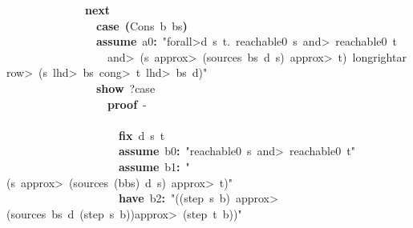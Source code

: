 \documentclass{article}
\newcommand{\syntaxKEYWORDA}[1]{\textcolor[rgb]{0.0,0.4,0.6}{\textbf{#1}}}
\newcommand{\syntaxKEYWORDC}[1]{\textcolor[rgb]{0.0,0.6,1.0}{\textbf{#1}}}
\newcommand{\syntaxLITERALA}[1]{\textcolor[rgb]{1.0,0.0,0.8}{#1}}
\newcommand{\syntaxOPERATOR}[1]{\textcolor[rgb]{0.0,0.0,0.0}{\textbf{#1}}}
\newcommand{\syntaxKEYWORDA}[1]{\textcolor[rgb]{0.0,0.4,0.6}{\textbf{#1}}}
\newcommand{\syntaxKEYWORDC}[1]{\textcolor[rgb]{0.0,0.6,1.0}{\textbf{#1}}}
\newcommand{\syntaxLITERALA}[1]{\textcolor[rgb]{1.0,0.0,0.8}{#1}}
\newcommand{\syntaxOPERATOR}[1]{\textcolor[rgb]{0.0,0.0,0.0}{\textbf{#1}}}
\newcommand{\syntaxKEYWORDA}[1]{\textcolor[rgb]{0.0,0.4,0.6}{\textbf{#1}}}
\newcommand{\syntaxKEYWORDC}[1]{\textcolor[rgb]{0.0,0.6,1.0}{\textbf{#1}}}
\newcommand{\syntaxLITERALA}[1]{\textcolor[rgb]{1.0,0.0,0.8}{#1}}
\newcommand{\syntaxOPERATOR}[1]{\textcolor[rgb]{0.0,0.0,0.0}{\textbf{#1}}}
\newcommand{\syntaxKEYWORDA}[1]{\textcolor[rgb]{0.0,0.4,0.6}{#1}}
\newcommand{\syntaxKEYWORDC}[1]{\textcolor[rgb]{0.0,0.6,1.0}{#1}}
\newcommand{\syntaxLITERALA}[1]{\textcolor[rgb]{1.0,0.0,0.8}{\textbf{#1}}}
\newcommand{\syntaxOPERATOR}[1]{\textcolor[rgb]{0.0,0.0,0.0}{#1}}
\newcommand{\syntaxKEYWORDA}[1]{\textcolor[rgb]{0.0,0.4,0.6}{\textbf{#1}}}
\newcommand{\syntaxKEYWORDC}[1]{\textcolor[rgb]{0.0,0.6,1.0}{\textbf{#1}}}
\newcommand{\syntaxLITERALA}[1]{\textcolor[rgb]{1.0,0.0,0.8}{#1}}
\newcommand{\syntaxOPERATOR}[1]{\textcolor[rgb]{0.0,0.0,0.0}{\textbf{#1}}}
\newcommand{\syntaxKEYWORDA}[1]{\textcolor[rgb]{0.0,0.4,0.6}{\textbf{#1}}}
\newcommand{\syntaxKEYWORDC}[1]{\textcolor[rgb]{0.0,0.6,1.0}{\textbf{#1}}}
\newcommand{\syntaxLITERALA}[1]{\textcolor[rgb]{1.0,0.0,0.8}{#1}}
\newcommand{\syntaxOPERATOR}[1]{\textcolor[rgb]{0.0,0.0,0.0}{\textbf{#1}}}
\begin{document}
{\ }{\ }{\ }{\ }{\ }{\ }{\ }{\ }{\ }{\ }{\ }{\ }{\ }{\ }\syntaxKEYWORDA{next}\hspace*{\fill}\\
{\ }{\ }{\ }{\ }{\ }{\ }{\ }{\ }{\ }{\ }{\ }{\ }{\ }{\ }{\ }{\ }\syntaxKEYWORDC{case}{\ }\syntaxOPERATOR{(}Cons{\ }b{\ }bs\syntaxOPERATOR{)}\hspace*{\fill}\\
{\ }{\ }{\ }{\ }{\ }{\ }{\ }{\ }{\ }{\ }{\ }{\ }{\ }{\ }{\ }{\ }\syntaxKEYWORDC{assume}{\ }a0\syntaxOPERATOR{:}{\ }\syntaxLITERALA{"\<forall>d{\ }s{\ }t.{\ }reachable0{\ }s{\ }\<and>{\ }reachable0{\ }t}\hspace*{\fill}\\
\syntaxLITERALA{{\ }{\ }{\ }{\ }{\ }{\ }{\ }{\ }{\ }{\ }{\ }{\ }{\ }{\ }{\ }{\ }{\ }{\ }\<and>{\ }(s{\ }\<approx>{\ }(sources{\ }bs{\ }d{\ }s){\ }\<approx>{\ }t){\ }\<longrightarrow>{\ }(s{\ }\<lhd>{\ }bs{\ }\<cong>{\ }t{\ }\<lhd>{\ }bs{\ }\usebox{\atbox}{\ }d)"}\hspace*{\fill}\\
{\ }{\ }{\ }{\ }{\ }{\ }{\ }{\ }{\ }{\ }{\ }{\ }{\ }{\ }{\ }{\ }\syntaxKEYWORDC{show}{\ }?case\hspace*{\fill}\\
{\ }{\ }{\ }{\ }{\ }{\ }{\ }{\ }{\ }{\ }{\ }{\ }{\ }{\ }{\ }{\ }{\ }{\ }\syntaxKEYWORDA{proof}{\ }{-}\hspace*{\fill}\\
{\ }{\ }{\ }{\ }{\ }{\ }{\ }{\ }{\ }{\ }{\ }{\ }{\ }{\ }{\ }{\ }{\ }{\ }\syntaxKEYWORDA{\usebox{\opencurlybracket}}\hspace*{\fill}\\
{\ }{\ }{\ }{\ }{\ }{\ }{\ }{\ }{\ }{\ }{\ }{\ }{\ }{\ }{\ }{\ }{\ }{\ }{\ }{\ }\syntaxKEYWORDC{fix}{\ }d{\ }s{\ }t\hspace*{\fill}\\
{\ }{\ }{\ }{\ }{\ }{\ }{\ }{\ }{\ }{\ }{\ }{\ }{\ }{\ }{\ }{\ }{\ }{\ }{\ }{\ }\syntaxKEYWORDC{assume}{\ }b0\syntaxOPERATOR{:}{\ }\syntaxLITERALA{"reachable0{\ }s{\ }\<and>{\ }reachable0{\ }t"}\hspace*{\fill}\\
{\ }{\ }{\ }{\ }{\ }{\ }{\ }{\ }{\ }{\ }{\ }{\ }{\ }{\ }{\ }{\ }{\ }{\ }{\ }{\ }\syntaxKEYWORDC{assume}{\ }b1\syntaxOPERATOR{:}{\ }\syntaxLITERALA{"(s{\ }\<approx>{\ }(sources{\ }(b\usebox{\hashbox}bs){\ }d{\ }s){\ }\<approx>{\ }t)"}\hspace*{\fill}\\
{\ }{\ }{\ }{\ }{\ }{\ }{\ }{\ }{\ }{\ }{\ }{\ }{\ }{\ }{\ }{\ }{\ }{\ }{\ }{\ }\syntaxKEYWORDA{have}{\ }b2\syntaxOPERATOR{:}{\ }\syntaxLITERALA{"((step{\ }s{\ }b){\ }\<approx>(sources{\ }bs{\ }d{\ }(step{\ }s{\ }b))\<approx>{\ }(step{\ }t{\ }b))"}\hspace*{\fill}\\
\end{document}
